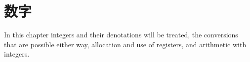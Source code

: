 \documentclass{book}
\begin{document}
\chapter{数字}\label{number}

In this chapter integers and their
denotations will be treated,
the conversions that are possible either way,
allocation and use of  registers, and
arithmetic with integers.

\label{cschap:number}\label{cschap:romannumeral}\label{cschap:count}\label{cschap:countdef}\label{cschap:newcount}\label{cschap:advance}\label{cschap:multiply}\label{cschap:divide}
\end{document}
